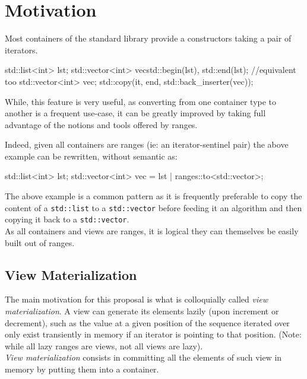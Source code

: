 \documentclass{wg21}
\newcommand{\cc}[1]{\texttt{#1}}
\begin{document}
\section{Motivation}

Most containers of the standard library provide a constructors taking a pair of iterators.

\begin{codeblock}
    std::list<int> lst;
    std::vector<int> vec{std::begin(lst), std::end(lst)};
    //equivalent too
    std::vector<int> vec;
    std::copy(it, end, std::back_inserter(vec));
\end{codeblock}

While, this feature is very useful, as converting from one container type to another is a frequent
use-case, it can be greatly improved by taking full advantage of the notions and tools offered by ranges.

Indeed, given all containers are ranges (ie: an iterator-sentinel pair) the above example can be rewritten, without semantic as:

\begin{codeblock}
    std::list<int> lst;
    std::vector<int> vec = lst | ranges::to<std::vector>;
\end{codeblock}


The above example is a common pattern as it is frequently preferable to copy the content of a \cc{std::list} to
a \cc{std::vector} before feeding it an algorithm and then copying it back to a \cc{std::vector}.\\

As all containers and views are ranges, it is logical they can themselves be easily built out of ranges.

\subsection{View Materialization}

The main motivation for this proposal is what is colloquially called \emph{view materialization}.
A view can generate its elements lazily (upon increment or decrement), such as the value at a given position of the sequence
iterated over only exist transiently in memory if an iterator is pointing to that position.
(Note: while all lazy ranges are views, not all views are lazy).\\

\emph{View materialization} consists in committing all the elements of such view in memory by putting them into a container.
\end{document}
